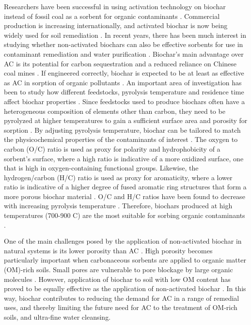 Researchers have been successful in using activation technology on biochar instead of fossil coal as a sorbent for organic contaminants \citep{Sormo2021}. Commercial production is increasing internationally, and activated biochar is now being widely used for soil remediation \citep{hagemann2018activated}. In recent years, there has been much interest in studying whether non-activated biochars can also be effective sorbents for use in contaminant remediation and water purification \citep{hagemann2018activated}. Biochar's main advantage over AC is its potential for carbon sequestration \citep{smith2016soil} and a reduced reliance on Chinese coal mines \citep{zheng2019influence}. If engineered correctly, biochar is expected to be at least as effective as AC in sorption of organic pollutants \citep{Sormo2021}. An important area of investigation has been to study how different feedstocks, pyrolysis temperature and residence time affect biochar properties \citep{Hale2016}. Since feedstocks used to produce biochars often have a heterogeneous composition of elements other than carbon, they need to be pyrolyzed at higher temperatures to gain a sufficient surface area and porosity for sorption \citep{beesley2011review}. By adjusting pyrolysis temperature, biochar can be tailored to match the physicochemical properties of the contaminants of interest \citep{Hale2016}. The oxygen to carbon (O/C) ratio is used as proxy for polarity and hydrophobicity of a sorbent's surface, where a high ratio is indicative of a more oxidized surface, one that is high in oxygen-containing functional groups. Likewise, the hydrogen/carbon (H/C) ratio is used as proxy for aromaticity, where a lower ratio is indicative of a higher degree of fused aromatic ring structures that form a more porous biochar material \citep{Ahmad2014}. O/C and H/C ratios have been found to decrease with increasing pyrolysis temperature \citep{Hale2016}. Therefore, biochars produced at high temperatures (700-900 \textdegree C) are the most suitable for sorbing organic contaminants \citep{Figueiredo2018}. 

One of the main challenges posed by the application of non-activated biochar in natural systems is its lower porosity than AC \citep{leng2021overview}. High porosity becomes particularly important when carbonaceous sorbents are applied to organic matter (\acrshort{OM})-rich soils. Small pores are vulnerable to pore blockage by large organic molecules \citep{Sorengard2019}. However, application of biochar to soil with low OM content has proved to be equally effective as the application of non-activated biochar \citep{Alhashimi2017}. In this way, biochar contributes to reducing the demand for AC in a range of remedial uses, and thereby limiting the future need for AC to the treatment of OM-rich soils, and ultra-fine water cleansing. 


